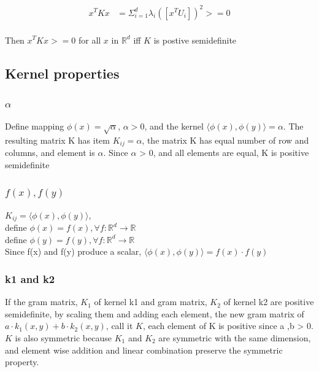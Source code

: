 \documentclass[letterpaper, 12pt]{article}
\begin{document}
\begin{equation*}
\begin{split}
x^T K x &= \Sigma_{i =1}^{d} \lambda_{i} ([x^T U_{i}])^2 >= 0\\
\end{split}
\end{equation*}

Then $x^T K x >= 0$ for all $x$ in $ \mathbb{R}^{d}$ iff $K$ is postive semidefinite

\subsection{Kernel properties}
\subsubsection{$\alpha$}
Define mapping $\phi (x) = \sqrt{\alpha}$, $\alpha > 0$, and the kernel $\langle \phi(x), \phi(y) \rangle = \alpha$.
The resulting matrix K has item $K_{ij} = \alpha $, the matrix K has equal number of row and columns, and element is $\alpha$. Since $\alpha$ > 0, and all elements are equal, K is positive semidefinite
 
\subsubsection{$f(x), f(y)$}
$K_{ij} = \langle \phi (x),  \phi (y) \rangle$, \\
define $\phi(x) = f(x), \forall f: \mathbb{R}^{d} \rightarrow \mathbb{R}$\\
define $\phi(y) = f(y), \forall f: \mathbb{R}^{d} \rightarrow \mathbb{R}$\\
Since f(x) and f(y) produce a scalar,  $\langle \phi (x),  \phi (y) \rangle = f(x) \cdot f(y)$

\subsubsection{k1 and k2}
If the gram matrix, $K_{1}$ of kernel k1 and gram matrix, $K_{2}$ of kernel k2 are positive semidefinite, by scaling them and adding each element, the new gram matrix of $a \cdot k_{1}(x, y) + b \cdot k_{2}(x, y)$, call it $K$, each element of K is positive since a ,b > 0.\\
$K$ is also symmetric because $K_{1}$ and $K_{2}$ are symmetric with the same dimension, and element wise addition and linear combination preserve the symmetric property.\\
\end{document}
